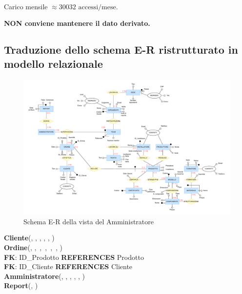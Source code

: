 \documentclass{article}
\begin{document}
Carico mensile $\approx 30032\text{ accessi/mese}$.

\textbf{NON conviene mantenere il dato derivato.}

\subsection{Traduzione dello schema E-R ristrutturato in modello relazionale}

\begin{figure}[H]
    \centering
    \includegraphics[width=24.25cm, angle=-90]{images/ristrutturato.drawio.pdf}
    \caption{Schema E-R della vista del Amministratore}
\end{figure}

\newpage

\textbf{Cliente}(\underline{}, , , , , )\\


\textbf{Ordine}(\underline{}, ,\, ,\, ,\, ,\, , )\\
\indent\indent \textbf{FK}: ID\_Prodotto \textbf{REFERENCES} Prodotto\\
\indent\indent \textbf{FK}: ID\_Cliente \textbf{REFERENCES} Cliente\\


\textbf{Amministratore}(\underline{}, , , , , )\\


\textbf{Report}(\underline{}, )\\
\end{document}
